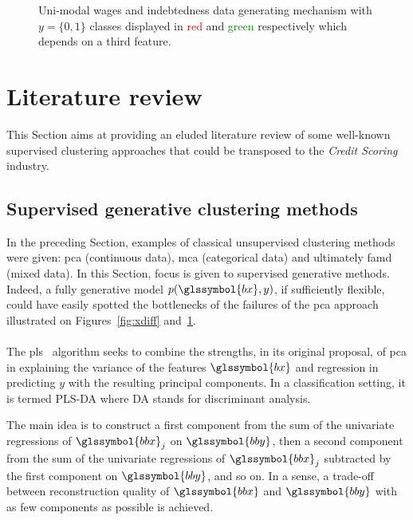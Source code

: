 \begin{figure}
\caption{\label{fig:ydiff} Uni-modal wages and indebtedness data generating mechanism with $y = \{0,1\}$ classes displayed in \textcolor{red}{red} and \textcolor{green}{green} respectively which depends on a third feature.}
\end{figure}








\section{Literature review} \label{sec:literature}

This Section aims at providing an eluded literature review of some well-known supervised clustering approaches that could be transposed to the \textit{Credit Scoring} industry.

\subsection{Supervised generative clustering methods} \label{subsec:sup_gen}

In the preceding Section, examples of classical unsupervised clustering methods were given: \gls{pca} (continuous data), \gls{mca} (categorical data) and ultimately \gls{famd} (mixed data). In this Section, focus is given to supervised generative methods. Indeed, a fully generative model $p(\glssymbol{bx},y)$, if sufficiently flexible, could have easily spotted the bottlenecks of the failures of the \gls{pca} approach illustrated on Figures~\ref{fig:xdiff} and~\ref{fig:ydiff}.

\paragraph{}

The \gls{pls}~\cite{wold1984collinearity} algorithm seeks to combine the strengths, in its original proposal, of \gls{pca} in explaining the variance of the features $\glssymbol{bx}$ and regression in predicting $y$ with the resulting principal components. In a classification setting, it is termed PLS-DA where DA stands for discriminant analysis.

The main idea is to construct a first component from the sum of the univariate regressions of $\glssymbol{bbx}_j$ on $\glssymbol{bby}$, then a second component from the sum of the univariate regressions of $\glssymbol{bbx}_j$ subtracted by the first component on $\glssymbol{bby}$, and so on. In a sense, a trade-off between reconstruction quality of $\glssymbol{bbx}$ and $\glssymbol{bby}$ with as few components as possible is achieved.

